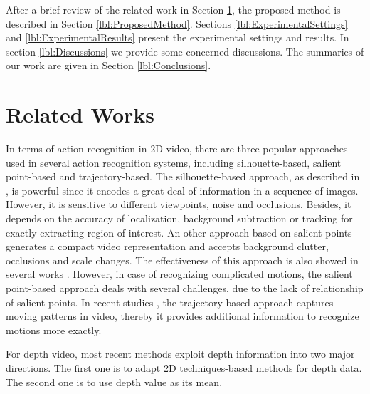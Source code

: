 \documentclass[review]{elsarticle}
\begin{document}
After a brief review of the related work in Section \ref{lbl:RelatedWorks}, the proposed method is described in Section \ref{lbl:ProposedMethod}. Sections \ref{lbl:ExperimentalSettings} and \ref{lbl:ExperimentalResults} present the experimental settings and results. In section \ref{lbl:Discussions} we provide some concerned discussions. The summaries of our work are given in Section \ref{lbl:Conclusions}.

\section{Related Works}
\label{lbl:RelatedWorks}

In terms of action recognition in 2D video, there are three popular approaches used in several action recognition systems, including silhouette-based, salient point-based and trajectory-based.
The silhouette-based approach, as described in \cite{blank2005actions, ke2007event, vitaladevuni2008action, yilmaz2005actions}, is powerful since it encodes a great deal of information in a sequence of images.
However, it is sensitive to different viewpoints, noise and occlusions.
Besides, it depends on the accuracy of localization, background subtraction or tracking for exactly extracting region of interest.
An other approach based on salient points generates a compact video representation and accepts background clutter, occlusions and scale changes.
The effectiveness of this approach is also showed in several works \cite{laptev2005space, dollar2005behavior, laptev2008learning, bregonzio2009recognising, klaser2008aspatiotemporal, willems2008efficient}.
However, in case of recognizing complicated motions, the salient point-based approach deals with several challenges, due to the lack of relationship of salient points.
In recent studies \cite{matikainen2009trajectons, messing2009activity, sun2009hierarchical}, the trajectory-based approach captures moving patterns in video, thereby it provides additional information to recognize motions more exactly.

For depth video, most recent methods exploit depth information into two major directions. The first one is to adapt 2D techniques-based methods for depth data. The second one is to use depth value as its mean.
\end{document}
